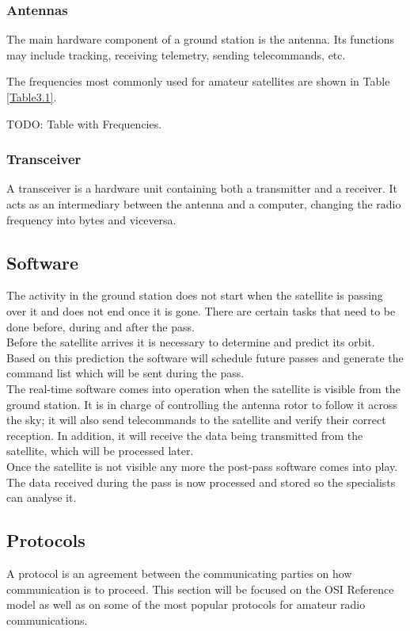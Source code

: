 \subsubsection{Antennas}
The main hardware component of a ground station is the antenna. Its functions may include tracking, receiving telemetry, sending telecommands, etc.
\pagebreak

The frequencies most commonly used for amateur satellites are shown in Table \ref{Table3.1}.

\begin{table}[h]

\caption{TODO: Table with Frequencies.}
  \label{Table3.1}
\end{table}
\subsubsection{Transceiver}
A transceiver is a hardware unit containing both a transmitter and a receiver. It acts as an intermediary between the antenna and a computer, changing the radio frequency into bytes and viceversa.

\subsection{Software}
The activity in the ground station does not start when the satellite is passing over it and does not end once it is gone. There are certain tasks that need to be done before, during and after the pass.\\

Before the satellite arrives it is necessary to determine and predict its orbit. Based on this prediction the software will schedule future passes and generate the command list which will be sent during the pass.\\

The real-time software comes into operation when the satellite is visible from the ground station. It is in charge of controlling the antenna rotor to follow it across the sky; it will also send telecommands to the satellite and verify their correct reception. In addition, it will receive the data being transmitted from the satellite, which will be processed later.\\

Once the satellite is not visible any more the post-pass software comes into play. The data received during the pass is now processed and stored so the specialists can analyse it.

\subsection{Protocols}
A protocol is an agreement between the communicating parties on how communication is to proceed\cite{Tanenbaum}. This section will be focused on the OSI Reference model as well as on some of the most popular protocols for amateur radio communications.
\pagebreak
